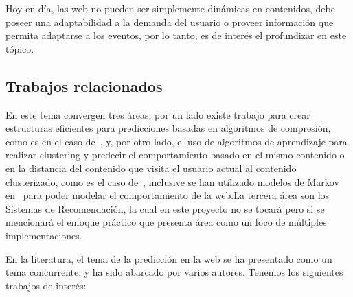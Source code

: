 \documentclass{udparticle}
\begin{document}
  Hoy en día, las web no pueden ser simplemente dinámicas en contenidos, debe poseer una adaptabilidad a la demanda del usuario o proveer información que permita adaptarse a los eventos, por lo tanto, es de interés el profundizar en este tópico.


\subsection{Trabajos relacionados}

En este tema convergen tres áreas, por un lado existe trabajo para crear estructuras eficientes para predicciones basadas en algoritmos de compresión, como es en el caso de~\cite{Claude2014}, y, por otro lado, el uso de algoritmos de aprendizaje para realizar clustering y predecir el comportamiento basado en el mismo contenido o en la distancia del contenido que visita el usuario actual al contenido clusterizado, como es el caso de~\cite{Poornalatha2012}, inclusive se han utilizado modelos de Markov en~\cite{Dongshan2002}  para poder modelar el comportamiento de la web.La tercera área son los Sistemas de Recomendación, la cual en este proyecto no se tocará pero si se mencionará el enfoque práctico que presenta área como un foco de múltiples implementaciones. 


En la literatura, el tema de la predicción en la web se ha presentado como un tema concurrente, y ha sido abarcado por varios autores. Tenemos los siguientes trabajos de interés:
\end{document}

